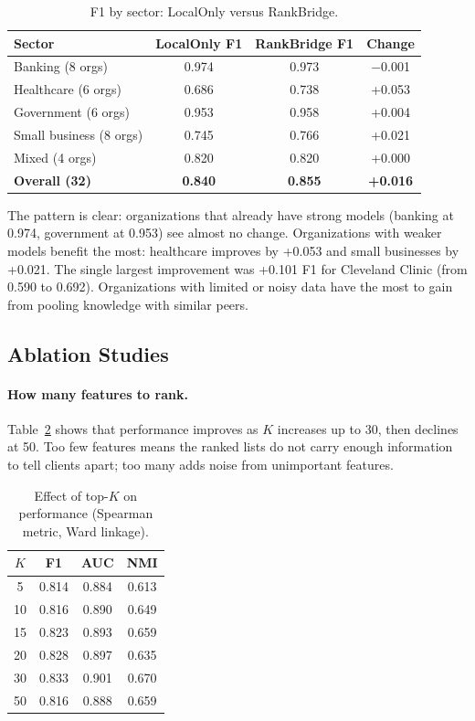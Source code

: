 \documentclass[12pt,a4paper]{article}
\begin{document}
\begin{table}[H]
\centering
\caption{F1 by sector: LocalOnly versus RankBridge.}\label{tab:per_org}
\begin{tabular}{lccc}
\toprule
\textbf{Sector} & \textbf{LocalOnly F1} & \textbf{RankBridge F1} & \textbf{Change} \\
\midrule
Banking (8 orgs)       & 0.974 & 0.973 & $-$0.001 \\
Healthcare (6 orgs)    & 0.686 & 0.738 & +0.053 \\
Government (6 orgs)    & 0.953 & 0.958 & +0.004 \\
Small business (8 orgs) & 0.745 & 0.766 & +0.021 \\
Mixed (4 orgs)         & 0.820 & 0.820 & +0.000 \\
\midrule
\textbf{Overall (32)}  & \textbf{0.840} & \textbf{0.855} & \textbf{+0.016} \\
\bottomrule
\end{tabular}
\end{table}

The pattern is clear: organizations that already have strong models (banking at 0.974, government at 0.953) see almost no change. Organizations with weaker models benefit the most: healthcare improves by +0.053 and small businesses by +0.021. The single largest improvement was +0.101 F1 for Cleveland Clinic (from 0.590 to 0.692). Organizations with limited or noisy data have the most to gain from pooling knowledge with similar peers.

\subsection{Ablation Studies}

\paragraph{How many features to rank.} Table~\ref{tab:ablation_topk} shows that performance improves as $K$ increases up to 30, then declines at 50. Too few features means the ranked lists do not carry enough information to tell clients apart; too many adds noise from unimportant features.

\begin{table}[H]
\centering
\caption{Effect of top-$K$ on performance (Spearman metric, Ward linkage).}\label{tab:ablation_topk}
\begin{tabular}{cccc}
\toprule
$K$ & \textbf{F1} & \textbf{AUC} & \textbf{NMI} \\
\midrule
5   & 0.814 & 0.884 & 0.613 \\
10  & 0.816 & 0.890 & 0.649 \\
15  & 0.823 & 0.893 & 0.659 \\
20  & 0.828 & 0.897 & 0.635 \\
30  & 0.833 & 0.901 & 0.670 \\
50  & 0.816 & 0.888 & 0.659 \\
\bottomrule
\end{tabular}
\end{table}
\end{document}
